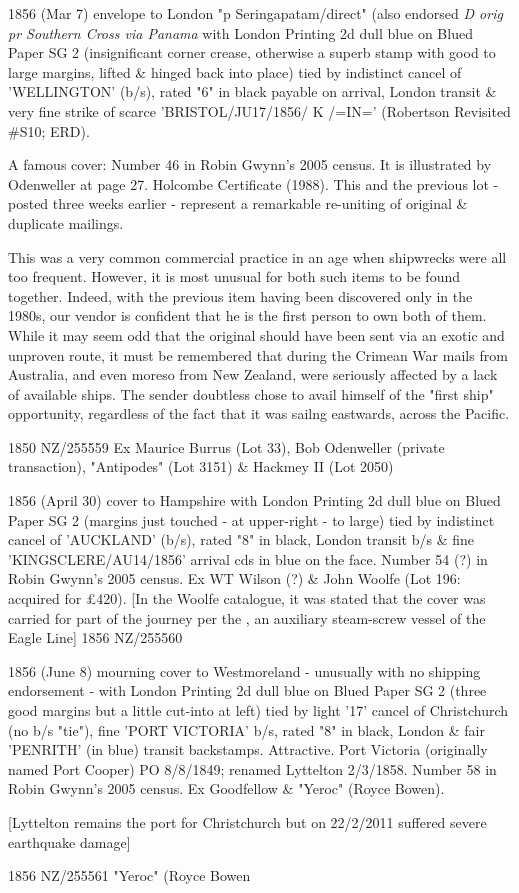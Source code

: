 \documentclass[justified]{tufte-book}
\begin{document}
%
{1856 (Mar 7) envelope to London "p Seringapatam/direct" (also endorsed \textit{D orig pr Southern Cross via Panama} with London Printing 2d dull blue on Blued Paper SG 2 (insignificant corner crease, otherwise a superb stamp with good to large margins, lifted \& hinged back into place) tied by indistinct cancel of 'WELLINGTON' (b/s), rated "6" in black payable on arrival, London transit \& very fine strike of scarce 'BRISTOL/JU17/1856/ K /=IN=' (Robertson Revisited \#S10; ERD). 

A famous cover: Number 46 in Robin Gwynn's 2005 census. It is illustrated by Odenweller at page 27. Holcombe Certificate (1988). This and the previous lot - posted three weeks earlier - represent a remarkable re-uniting of original \& duplicate mailings.

This was a very common commercial practice in an age when shipwrecks were all too frequent. However, it is most unusual for both such items to be found together. Indeed, with the previous item having been discovered only in the 1980s, our vendor is confident that he is the first person to own both of them. While it may seem odd that the original should have been sent via an exotic and unproven route, it must be remembered that during the Crimean War mails from Australia, and even moreso from New Zealand, were seriously affected by a lack of available ships. The sender doubtless chose to avail himself of the "first ship" opportunity, regardless of the fact that it was sailng eastwards, across the Pacific.}%
{1850}%
{NZ/255559}%
{Ex Maurice Burrus (Lot 33), Bob Odenweller (private transaction), "Antipodes" (Lot 3151) \& Hackmey II (Lot 2050)}%
{}
{}%
{}%


%
{1856 (April 30) cover to Hampshire with London Printing 2d dull blue on Blued Paper SG 2 (margins just touched - at upper-right - to large) tied by indistinct cancel of 'AUCKLAND' (b/s), rated "8" in black, London transit b/s \& fine 'KINGSCLERE/AU14/1856' arrival cds in blue on the face. Number 54 (?) in Robin Gwynn's 2005 census. Ex WT Wilson (?) \& John Woolfe (Lot 196: acquired for £420). [In the Woolfe catalogue, it was stated that the cover was carried for part of the journey per the , an auxiliary steam-screw vessel of the Eagle Line]}%
{1856}%
{NZ/255560}%
{}%
{}
{}%
{}%

%
{1856 (June 8) mourning cover to Westmoreland - unusually with no shipping endorsement - with London Printing 2d dull blue on Blued Paper SG 2 (three good margins but a little cut-into at left) tied by light '17' cancel of Christchurch (no b/s "tie"), fine 'PORT VICTORIA' b/s, rated "8" in black, London \& fair 'PENRITH' (in blue) transit backstamps. Attractive. Port Victoria (originally named Port Cooper) PO 8/8/1849; renamed Lyttelton 2/3/1858. Number 58 in Robin Gwynn's 2005 census. Ex Goodfellow \& "Yeroc" (Royce Bowen). 

[Lyttelton remains the port for Christchurch but on 22/2/2011 suffered severe earthquake damage]}%
{1856}%
{NZ/255561}%
{"Yeroc" (Royce Bowen}%
{}
{}%
{}%
\end{document}
